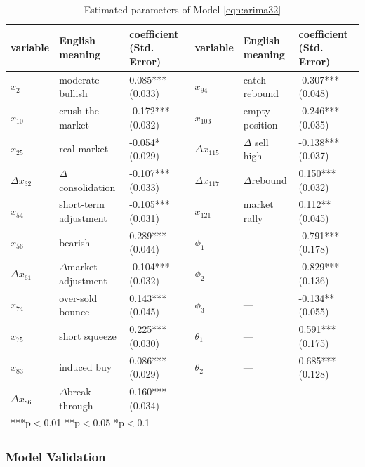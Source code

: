 \documentclass[review,3p,times,12pt,number]{elsarticle}
\begin{document}
\begin{table}[htbp]
\caption{Estimated parameters of Model \ref{eqn:arima32}}
\scriptsize
\center
\label{tab:arima32-open}
\begin{tabular} {l l p{2.3cm}|| l l p{2.3cm}}
\hline
variable         &	English meaning	     & coefficient (Std. Error)&	variable      &	English meaning      &	coefficient (Std. Error)\\
\hline
$x_2$            & moderate bullish	     &0.085***(0.033)          & $x_{94}$         &catch rebound         & -0.307***(0.048) \\
\hline
$x_{10}$         & crush the market	     &-0.172***(0.032)         & $x_{103}$        &empty position	     & -0.246***(0.035) \\
\hline
$x_{25}$         &real market	         &-0.054*(0.029)           & $\Delta x_{115}$        & $\Delta$ sell high	     & -0.138***(0.037) \\
\hline
$\Delta x_{32}$  & $\Delta$consolidation &-0.107***(0.033)         & $\Delta x_{117}$ & $\Delta$rebound      & 0.150***(0.032) \\
\hline
$x_{54}$         &short-term adjustment	 &-0.105***(0.031)         & $x_{121}$        &market rally	         & 0.112**(0.045) \\
\hline
$x_{56}$         &bearish	             &0.289***(0.044)	       &$\phi_1$	      &---	                 & -0.791***(0.178)\\
\hline
$\Delta x_{61}$  &$\Delta$market adjustment  &-0.104***(0.032)	   &$\phi_2$	      &---	                 & -0.829***(0.136)\\
\hline
$x_{74}$         &over-sold bounce	     &0.143***(0.045)	       &$\phi_3$	      &---	                 & -0.134**(0.055)\\
\hline
$x_{75}$         &short squeeze	         &0.225***(0.030)	       &$\theta_1$	      &---	                 & 0.591***(0.175)\\
\hline
$x_{83}$         &induced buy	         &0.086***(0.029)	       &$\theta_2$	      &---	                 & 0.685***(0.128)\\
\hline
$\Delta x_{86}$  & $\Delta$break through & 0.160***(0.034)\\

\hline
\multicolumn{6}{l}{***p$<$0.01  **p$<$0.05  *p$<$0.1}
\end{tabular}
\end{table}

\subsubsection{Model Validation}
\end{document}
